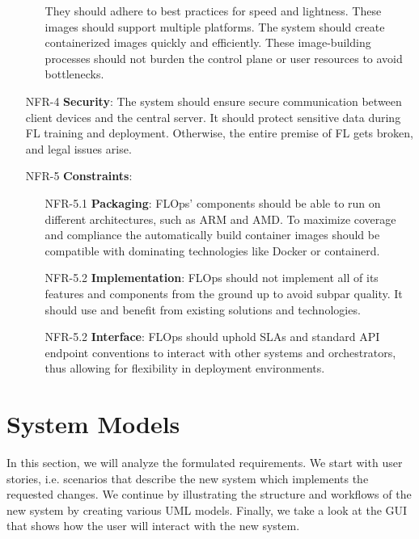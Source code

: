 \begin{itemize}
\begin{itemize}
            They should adhere to best practices for speed and lightness.
            These images should support multiple platforms.
            The system should create containerized images quickly and efficiently.
            These image-building processes should not burden the control plane or user resources to avoid bottlenecks.
        \end{itemize}
    \item [NFR-4] {\textbf{Security}}:
        The system should ensure secure communication between client devices and the central server.
        It should protect sensitive data during FL training and deployment.
        Otherwise, the entire premise of FL gets broken, and legal issues arise.
    \item [NFR-5] {\textbf{Constraints}}:
        \begin{itemize}
            \item [NFR-5.1] {\textbf{Packaging}}:
                FLOps' components should be able to run on different architectures, such as ARM and AMD.
                To maximize coverage and compliance the automatically build container images should be compatible with dominating technologies like Docker or containerd.
            \item [NFR-5.2] {\textbf{Implementation}}:
                FLOps should not implement all of its features and components from the ground up to avoid subpar quality.
                It should use and benefit from existing solutions and technologies.
            \item [NFR-5.2] {\textbf{Interface}}:
                FLOps should uphold SLAs and standard API endpoint conventions to interact with other systems and orchestrators, thus allowing for flexibility in deployment environments.
        \end{itemize}
\end{itemize}




\section{System Models}

In this section, we will analyze the formulated requirements. We start with user stories, i.e. scenarios that describe the new system which implements the requested changes.
We continue by illustrating the structure and workflows of the new system by creating various UML models.
Finally, we take a look at the GUI that shows how the user will interact with the new system.


